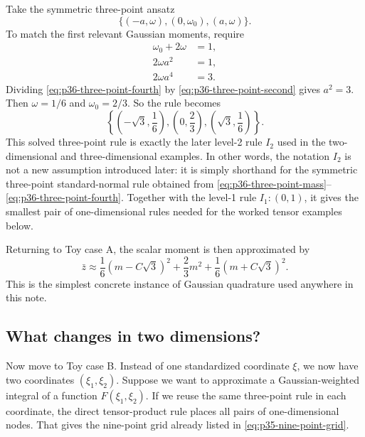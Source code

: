 \documentclass[11pt]{article}
\numberwithin{equation}{section}
\begin{document}
Take the symmetric three-point ansatz
\begin{equation}
  \{(-a,\omega),(0,\omega_0),(a,\omega)\}.
  \label{eq:p36-three-point-ansatz}
\end{equation}
To match the first relevant Gaussian moments, require
\begin{align}
  \omega_0+2\omega &= 1,
  \label{eq:p36-three-point-mass}\\
  2\omega a^2 &= 1,
  \label{eq:p36-three-point-second}\\
  2\omega a^4 &= 3.
  \label{eq:p36-three-point-fourth}
\end{align}
Dividing \eqref{eq:p36-three-point-fourth} by
\eqref{eq:p36-three-point-second} gives \(a^2=3\).  Then
\(\omega=1/6\) and \(\omega_0=2/3\).  So the rule becomes
\begin{equation}
  \left\{\left(-\sqrt3,\frac16\right),\left(0,\frac23\right),
  \left(\sqrt3,\frac16\right)\right\}.
  \label{eq:p36-three-point-rule}
\end{equation}
This solved three-point rule is exactly the later level-2 rule \(I_2\) used in
the two-dimensional and three-dimensional examples.  In other words, the notation
\(I_2\) is not a new assumption introduced later: it is simply shorthand for the
symmetric three-point standard-normal rule obtained from
\eqref{eq:p36-three-point-mass}--\eqref{eq:p36-three-point-fourth}.  Together
with the level-1 rule \(I_1:(0,1)\), it gives the smallest pair of
one-dimensional rules needed for the worked tensor examples below.

Returning to Toy case A, the scalar moment is then approximated by
\begin{equation}
  \bar z
  \approx
  \frac16(m-C\sqrt3)^2 + \frac23 m^2 + \frac16(m+C\sqrt3)^2.
  \label{eq:p36-scalar-three-point-approx}
\end{equation}
This is the simplest concrete instance of Gaussian quadrature used anywhere in
this note.

\subsection{What changes in two dimensions?}

Now move to Toy case B.  Instead of one standardized coordinate \(\xi\), we now
have two coordinates \((\xi_1,\xi_2)\).  Suppose we want to approximate a
Gaussian-weighted integral of a function \(F(\xi_1,\xi_2)\).  If we reuse the same
three-point rule in each coordinate, the direct tensor-product rule places all
pairs of one-dimensional nodes.  That gives the nine-point grid already listed in
\eqref{eq:p35-nine-point-grid}.
\end{document}

